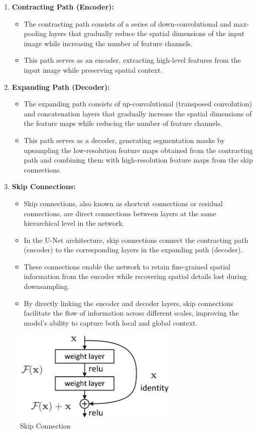 \begin{enumerate}
  \item \textbf{Contracting Path (Encoder):}
    \begin{itemize}
      \item The contracting path consists of a series of down-convolutional and max-pooling layers that gradually reduce the spatial dimensions of the input image while increasing the number of feature channels.
      \item This path serves as an encoder, extracting high-level features from the input image while preserving spatial context.
    \end{itemize}
  \item \textbf{Expanding Path (Decoder):}
    \begin{itemize}
      \item The expanding path consists of up-convolutional (transposed convolution) and concatenation layers that gradually increase the spatial dimensions of the feature maps while reducing the number of feature channels.
      \item This path serves as a decoder, generating segmentation masks by upsampling the low-resolution feature maps obtained from the contracting path and combining them with high-resolution feature maps from the skip connections.
    \end{itemize}
  \item \textbf{Skip Connections:}
    \begin{itemize}
      \item Skip connections, also known as shortcut connections or residual connections, are direct connections between layers at the same hierarchical level in the network.
      \item In the U-Net architecture, skip connections connect the contracting path (encoder) to the corresponding layers in the expanding path (decoder).
      \item These connections enable the network to retain fine-grained spatial information from the encoder while recovering spatial details lost during downsampling.
      \item By directly linking the encoder and decoder layers, skip connections facilitate the flow of information across different scales, improving the model's ability to capture both local and global context.
    \end{itemize}
\end{enumerate}
\begin{figure}[ht]
    \centering
    \includegraphics[width=8cm]{images/Theory-DL/Skip.png}
    \caption{Skip Connection}
    \label{fig:Skip}
\end{figure}
